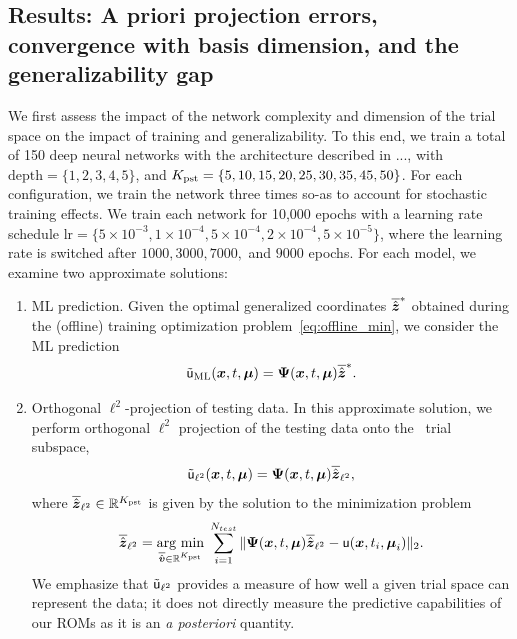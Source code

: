 \documentclass[3p,computermodern,10pt]{elsarticle}
\begin{document}
\subsection{Results: A priori projection errors, convergence with basis dimension, and the generalizability gap}
We first assess the impact of the network complexity and dimension of the trial space on the impact of training and generalizability. To this end, we train a total of 150 deep neural networks with the architecture described in ..., with $\text{depth} = \{1,2,3,4,5\}$, and $K_{\text{pst}} = \{5,10,15,20,25,30,35,45,50\}$. For each configuration, we train the network three times so-as to account for stochastic training effects. We train each network for 10,000 epochs with a learning rate schedule $\text{lr} = \{5\times 10^{-3},1 \times 10^{-4},5 \times 10^{-4},2 \times 10^{-4},5 \times 10^{-5}\}$, where the learning rate is switched after $1000,3000,7000,$ and $9000$ epochs. For each model, we examine two approximate solutions:
\begin{enumerate}
\item ML prediction. Given the optimal generalized coordinates $\overline{\hat{\boldsymbol z}}^*$ obtained during the (offline) training optimization problem~\eqref{eq:offline_min}, we consider the ML prediction
$$\tilde{\mathsf{u}}_{\text{ML}}(\boldsymbol x,t,\boldsymbol \mu)= \boldsymbol \Psi(\boldsymbol x,t,\boldsymbol \mu) \overline{\hat{\boldsymbol z}}^*.$$ 
\item Orthogonal $\ell^2$-projection of testing data. In this approximate solution, we perform orthogonal $\ell^2$ projection of the testing data onto the \parametricSpaceTimeAcronym\ trial subspace,
$$\tilde{\mathsf{u}}_{\ell^2}(\boldsymbol x,t,\boldsymbol \mu) = \boldsymbol \Psi(\boldsymbol x,t,\boldsymbol \mu) \overline{\hat{\boldsymbol z}}_{\ell^2},$$
where $\overline{\hat{\boldsymbol z}}_{\ell^2} \in \mathbb{R}^{K_{\text{pst}}}$ is given by the solution to the minimization problem
$$\overline{\hat{\boldsymbol z}}_{\ell^2} = \underset{ \overline{\hat{\boldsymbol v}} \in \mathbb{R}^{K_{\text{pst}}} }{\text{arg min} } \; \sum_{i=1}^{N_{test}} \| \boldsymbol \Psi(\boldsymbol x,t,\boldsymbol \mu) \overline{\hat{\boldsymbol z}}_{\ell^2}  - \mathsf{u}(\boldsymbol x,t_i,\boldsymbol \mu_i) \|_2.$$
We emphasize that $\tilde{\mathsf{u}}_{\ell^2}$ provides a measure of how well a given trial space can represent the data; it does not directly measure the predictive capabilities of our ROMs as it is an \textit{a posteriori} quantity. 
\end{enumerate}
\end{document}
